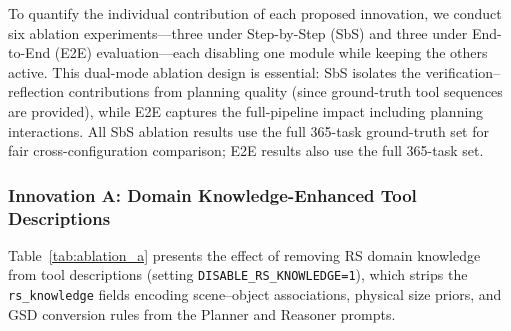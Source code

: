 \documentclass[journal]{IEEEtran}
\begin{document}
To quantify the individual contribution of each proposed innovation, we conduct six ablation experiments---three under Step-by-Step (SbS) and three under End-to-End (E2E) evaluation---each disabling one module while keeping the others active.
This dual-mode ablation design is essential: SbS isolates the verification--reflection contributions from planning quality (since ground-truth tool sequences are provided), while E2E captures the full-pipeline impact including planning interactions.
All SbS ablation results use the full 365-task ground-truth set for fair cross-configuration comparison; E2E results also use the full 365-task set.

\subsubsection{Innovation A: Domain Knowledge-Enhanced Tool Descriptions}

Table~\ref{tab:ablation_a} presents the effect of removing RS domain knowledge from tool descriptions (setting \texttt{DISABLE\_RS\_KNOWLEDGE=1}), which strips the \texttt{rs\_knowledge} fields encoding scene--object associations, physical size priors, and GSD conversion rules from the Planner and Reasoner prompts.

\begin{table}[t]
\centering
\caption{Ablation A: Effect of Domain Knowledge-Enhanced Tool Descriptions. ``w/'' denotes the full SR\textsuperscript{2}A; ``w/o'' removes all RS-specific knowledge from tool descriptions. SbS evaluates on 273 GT tasks (excluding unavailable tools); E2E evaluates all 365 GT tasks.}
\label{tab:ablation_a}
\end{table}
\end{document}
